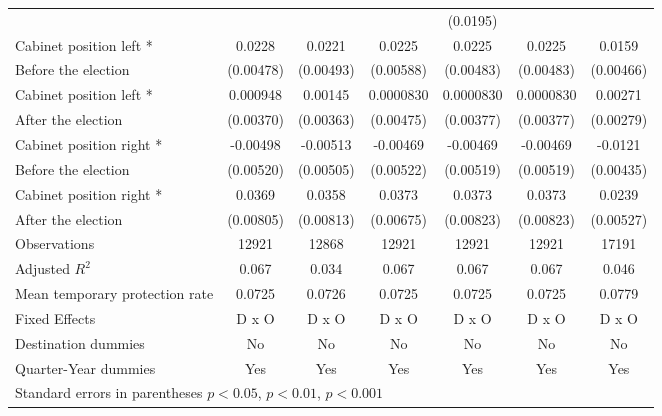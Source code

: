 \begin{table}[!ht]
\begin{tabular}{l*{6}{c}}
                    &                     &                     &                     &    (0.0195)         &                     &                     \\
[0,5em]
Cabinet position left *&      0.0228\sym{***}&      0.0221\sym{***}&      0.0225\sym{***}&      0.0225\sym{***}&      0.0225\sym{***}&      0.0159\sym{**} \\
 Before the election                    &   (0.00478)         &   (0.00493)         &   (0.00588)         &   (0.00483)         &   (0.00483)         &   (0.00466)         \\
[0,5em]
Cabinet position left * &    0.000948         &     0.00145         &   0.0000830         &   0.0000830         &   0.0000830         &     0.00271         \\
After the election                    &   (0.00370)         &   (0.00363)         &   (0.00475)         &   (0.00377)         &   (0.00377)         &   (0.00279)         \\
[0,5em]
Cabinet position right * &    -0.00498         &    -0.00513         &    -0.00469         &    -0.00469         &    -0.00469         &     -0.0121\sym{**} \\
Before the election                    &   (0.00520)         &   (0.00505)         &   (0.00522)         &   (0.00519)         &   (0.00519)         &   (0.00435)         \\
[0,5em]
Cabinet position right * &      0.0369\sym{***}&      0.0358\sym{***}&      0.0373\sym{***}&      0.0373\sym{***}&      0.0373\sym{***}&      0.0239\sym{***}\\
After the election                    &   (0.00805)         &   (0.00813)         &   (0.00675)         &   (0.00823)         &   (0.00823)         &   (0.00527)         \\
\hline
Observations        &       12921         &       12868         &       12921         &       12921         &       12921         &       17191         \\
Adjusted \(R^{2}\)  &       0.067         &       0.034         &       0.067         &       0.067         &       0.067         &       0.046         \\
Mean temporary protection rate&      0.0725         &      0.0726         &      0.0725         &      0.0725         &      0.0725         &      0.0779         \\
Fixed Effects       &       D x O         &       D x O         &       D x O         &       D x O         &       D x O         &       D x O         \\
Destination dummies &          No         &          No         &          No         &          No         &          No         &          No         \\
Quarter-Year dummies&         Yes         &         Yes         &         Yes         &         Yes         &         Yes         &         Yes         \\
\hline\hline
\multicolumn{7}{l}{ Standard errors in parentheses \sym{*} \(p<0.05\), \sym{**} \(p<0.01\), \sym{***} \(p<0.001\)}\\
\end{tabular}
\end{table}
